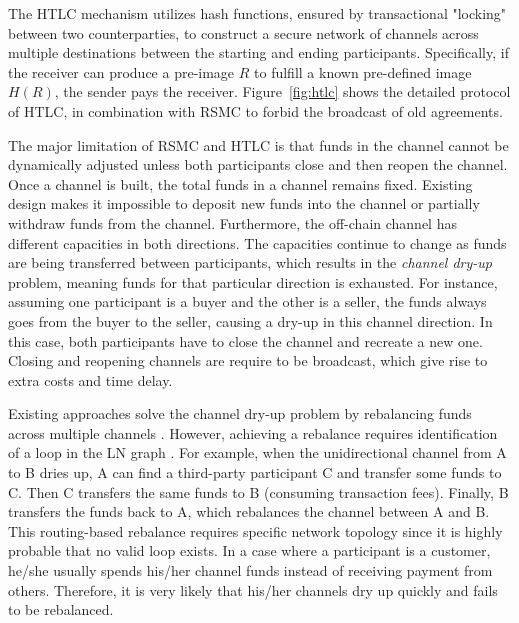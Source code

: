 The HTLC mechanism utilizes hash functions, ensured by transactional "locking" between two counterparties, to construct a secure network of channels across multiple destinations between the starting and ending participants\cite{poon2015bitcoin}. Specifically, if the receiver can produce a pre-image $R$ to fulfill a known pre-defined image $H(R)$, the sender pays the receiver. Figure~\ref{fig:htlc} shows the detailed protocol of HTLC, in combination with RSMC to forbid the broadcast of old agreements.


The major limitation of RSMC and HTLC is that funds in the channel cannot be dynamically adjusted unless both participants close and then reopen the channel. Once a channel is built, the total funds in a channel remains fixed. Existing design makes it impossible to deposit new funds into the channel or partially withdraw funds from the channel. Furthermore, the off-chain channel has different capacities in both directions. The capacities continue to change as funds are being transferred between participants, which results in the {\em channel dry-up} problem, meaning funds for that particular direction is exhausted. For instance, assuming one participant is a buyer and the other is a seller, the funds always goes from the buyer to the seller, causing a dry-up in this channel direction. In this case, both participants have to close the channel and recreate a new one. Closing and reopening channels are require to be broadcast, which give rise to extra costs and time delay.


Existing approaches solve the channel dry-up problem by rebalancing funds across multiple channels \cite{Khalil2017}. However, achieving a rebalance requires identification of a loop in the LN graph \cite{Khalil2017}. For example, when the unidirectional channel from A to B dries up, A can find a third-party participant C and transfer some funds to C. Then C transfers the same funds to B (consuming transaction fees). Finally, B transfers the funds back to A, which rebalances the channel between A and B.  This routing-based rebalance requires specific network topology since it is highly probable that no valid loop exists. In a case where a participant is a customer, he/she usually spends his/her channel funds instead of receiving payment from others. Therefore, it is very likely that his/her channels dry up quickly and fails to be rebalanced.
